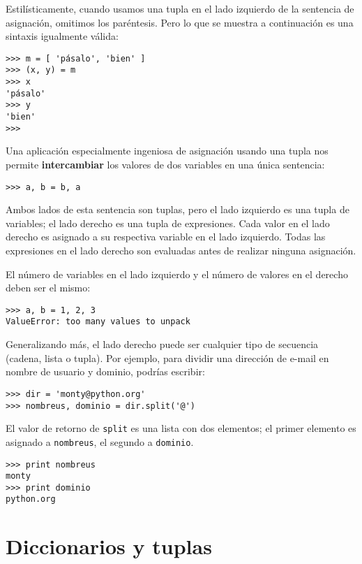 Estilísticamente, cuando usamos una tupla en el lado izquierdo de la sentencia
de asignación, omitimos los paréntesis. Pero lo que se muestra a continuación
es una sintaxis igualmente válida:

\beforeverb
\begin{verbatim}
>>> m = [ 'pásalo', 'bien' ]
>>> (x, y) = m
>>> x
'pásalo'
>>> y
'bien'
>>> 
\end{verbatim}
\afterverb
%
Una aplicación especialmente ingeniosa de asignación usando una tupla nos
permite {\bf intercambiar} los valores de dos variables en una única sentencia:

\beforeverb
\begin{verbatim}
>>> a, b = b, a
\end{verbatim}
\afterverb
%
Ambos lados de esta sentencia son tuplas, pero
el lado izquierdo es una tupla de variables; el lado derecho es una tupla
de expresiones. Cada valor en el lado derecho
es asignado a su respectiva variable en el lado izquierdo.
Todas las expresiones en el lado derecho son evaluadas antes de
realizar ninguna asignación.

El número de variables en el lado izquierdo y el número de
valores en el derecho deben ser el mismo:


\beforeverb
\begin{verbatim}
>>> a, b = 1, 2, 3
ValueError: too many values to unpack
\end{verbatim}
\afterverb
%
Generalizando más, el lado derecho puede ser cualquier tipo de secuencia
(cadena, lista o tupla). Por ejemplo, para dividir una dirección de e-mail
en nombre de usuario y dominio, podrías escribir:


\beforeverb
\begin{verbatim}
>>> dir = 'monty@python.org'
>>> nombreus, dominio = dir.split('@')
\end{verbatim}
\afterverb
%
El valor de retorno de {\tt split} es una lista con dos elementos;
el primer elemento es asignado a {\tt nombreus}, el segundo a
{\tt dominio}.

\beforeverb
\begin{verbatim}
>>> print nombreus
monty
>>> print dominio
python.org
\end{verbatim}
\afterverb
%

\section{Diccionarios y tuplas}

